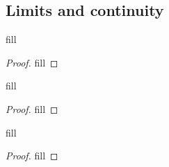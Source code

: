\subsection{Limits and continuity}

\begin{exercise}{40}
fill
\end{exercise}
\begin{proof}
fill
\end{proof}

\begin{exercise}{45}
fill
\end{exercise}
\begin{proof}
fill
\end{proof}

\begin{exercise}{46}
fill
\end{exercise}
\begin{proof}
fill
\end{proof}